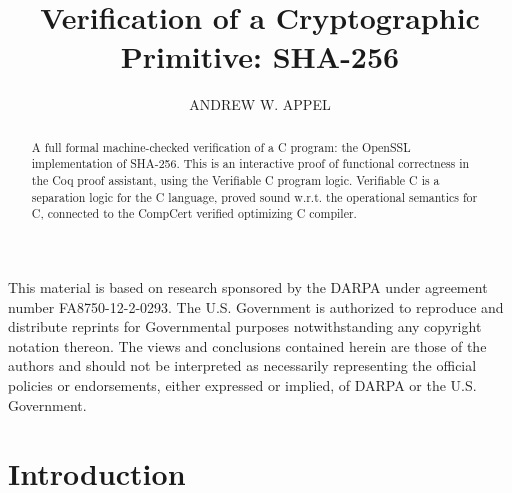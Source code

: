\documentclass[prodmode,acmtoplas]{acmsmall}
\begin{document}

%
\title{Verification of a Cryptographic Primitive: SHA-256}
\author{ANDREW W. APPEL }

\begin{bottomstuff}
This material is based on research sponsored by the DARPA under
agreement number FA8750-12-2-0293.  The U.S. Government is authorized
to reproduce and distribute reprints for Governmental purposes
notwithstanding any copyright notation thereon. The views and
conclusions contained herein are those of the authors and should not
be interpreted as necessarily representing the official policies or
endorsements, either expressed or implied, of DARPA or the
U.S. Government.
\end{bottomstuff}



\begin{abstract}
A full formal machine-checked verification of a C program:
the OpenSSL implementation of SHA-256.  This is an interactive
proof of functional correctness
in the Coq proof assistant, using the Verifiable C program logic.
Verifiable C is a separation logic for the C language,
proved sound w.r.t. the operational semantics for C,
connected to the CompCert verified optimizing C compiler.
\end{abstract}




\maketitle

\section{Introduction}
\label{sec:intro}
\end{document}
